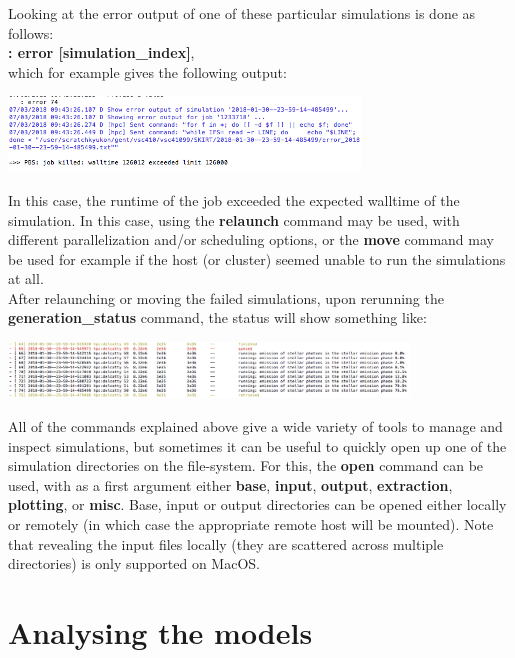 \documentclass[15pt,a4paper,oneside,openright]{report}
\begin{document}
Looking at the error output of one of these particular simulations is done as follows:\\

\textbf{: error [simulation\_index]},\\

which for example gives the following output:

\begin{center}
\includegraphics[width=0.7\textwidth]{figures/error_job.png}
\end{center}

In this case, the runtime of the job exceeded the expected walltime of the simulation. In this case, using the \textbf{relaunch} command may be used, with different parallelization and/or scheduling options, or the \textbf{move} command may be used for example if the host (or cluster) seemed unable to run the simulations at all.\\ 

After relaunching or moving the failed simulations, upon rerunning the \textbf{generation\_status} command, the status will show something like:

\begin{center}
\includegraphics[width=0.8\textwidth]{figures/running_more.png}
\end{center}

All of the commands explained above give a wide variety of tools to manage and inspect simulations, but sometimes it can be useful to quickly open up one of the simulation directories on the file-system. For this, the \textbf{open} command can be used, with as a first argument either \textbf{base}, \textbf{input}, \textbf{output}, \textbf{extraction}, \textbf{plotting}, or \textbf{misc}. Base, input or output directories can be opened either locally or remotely (in which case the appropriate remote host will be mounted). Note that revealing the input files locally (they are scattered across multiple directories) is only supported on MacOS.\\

\part{Analysing the models}
\end{document}
